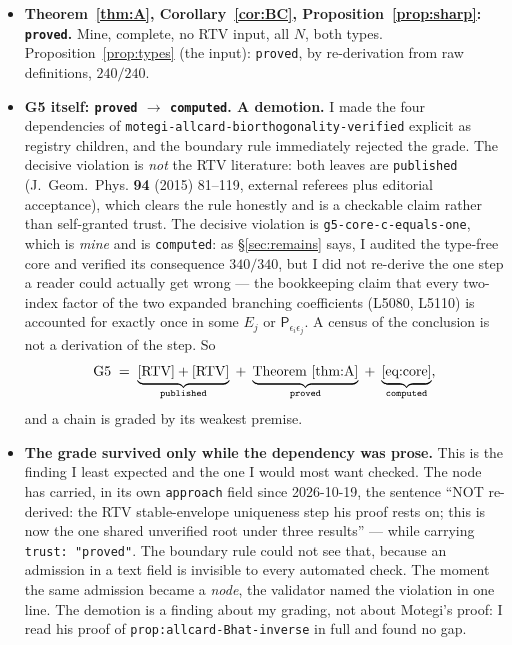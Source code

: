 \documentclass[11pt]{article}
\theoremstyle{plain}
\theoremstyle{definition}
\theoremstyle{remark}
\begin{document}
\begin{itemize}[itemsep=3pt]
\item \textbf{Theorem~\ref{thm:A}, Corollary~\ref{cor:BC},
Proposition~\ref{prop:sharp}: \texttt{proved}.} Mine, complete, no RTV input, all
$N$, both types. Proposition~\ref{prop:types} (the input): \texttt{proved}, by
re-derivation from raw definitions, $240/240$.
\item \textbf{G5 itself: \texttt{proved} $\rightarrow$ \texttt{computed}. A demotion.}
I made the four dependencies of
\texttt{motegi-allcard-biorthogonality-verified} explicit as registry children,
and the boundary rule immediately rejected the grade. The decisive violation is
\emph{not} the RTV literature: both leaves are \texttt{published} (J.~Geom.~Phys.
\textbf{94} (2015) 81--119, external referees plus editorial acceptance), which
clears the rule honestly and is a checkable claim rather than self-granted trust.
The decisive violation is \texttt{g5-core-c-equals-one}, which is \emph{mine} and
is \texttt{computed}: as \S\ref{sec:remains} says, I audited the type-free core
and verified its consequence $340/340$, but I did not re-derive the one step a
reader could actually get wrong --- the bookkeeping claim that every two-index
factor of the two expanded branching coefficients (L5080, L5110) is accounted
for exactly once in some $E_j$ or $\mathsf P_{\epsilon_i\epsilon_j}$. A census of
the conclusion is not a derivation of the step. So
\[
\text{G5} \;=\;
\underbrace{\text{\cite[Thm.~6.6/(6.7)]{RTV}} + \text{\cite[Thms.~3.1, 6.7]{RTV}}}_{\texttt{published}}
\;+\;
\underbrace{\text{Theorem~\ref{thm:A}}}_{\texttt{proved}}
\;+\;
\underbrace{\eqref{eq:core}}_{\texttt{computed}},
\]
and a chain is graded by its weakest premise.

\item \textbf{The grade survived only while the dependency was prose.}
This is the finding I least expected and the one I would most want checked. The
node has carried, in its own \texttt{approach} field since 2026-10-19, the
sentence ``NOT re-derived: the RTV stable-envelope uniqueness step his proof rests
on; this is now the one shared unverified root under three results'' --- while
carrying \texttt{trust: "proved"}. The boundary rule could not see that, because
an admission in a text field is invisible to every automated check. The moment
the same admission became a \emph{node}, the validator named the violation in one
line. The demotion is a finding about my grading, not about Motegi's proof: I read
his proof of \texttt{prop:allcard-Bhat-inverse} in full and found no gap.


\end{itemize}
\end{document}
